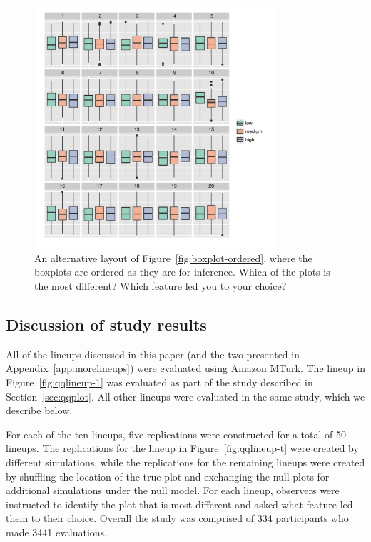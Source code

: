 \documentclass[12pt]{article} %
\begin{document}
\begin{figure}[h]
	\centering
	\includegraphics[width=0.8\textwidth]{autism2-unordered-10.pdf}
	\caption{\label{fig:boxplot-unordered} An alternative layout of Figure~\ref{fig:boxplot-ordered}, where the boxplots are ordered as they are for inference. Which of the plots is the most different? Which feature led you to your choice?}
\end{figure}

\subsection{Discussion of study results} %

All of the lineups discussed in this paper (and the two presented in Appendix~\ref{app:morelineups}) were evaluated using Amazon MTurk. The lineup in Figure~\ref{fig:qqlineup-1} was evaluated as part of the study described in Section~\ref{sec:qqplot}. All other lineups were evaluated in the same study, which we describe below.

For each of the ten lineups, five replications were constructed for a total of 50 lineups. The replications for the lineup in Figure~\ref{fig:qqlineup-t} were created by different simulations, while the replications for the remaining lineups were created by shuffling the location of the true plot and exchanging the null plots for additional simulations under the null model. For each lineup, observers were instructed to identify the plot that is most different and asked what feature led them to their choice. Overall the study was comprised of  334 participants who made 3441 evaluations. 
\end{document}
